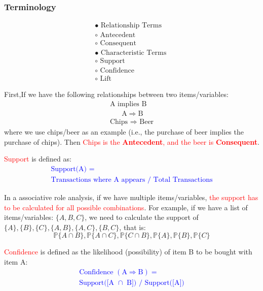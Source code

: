 \documentclass[12pt]{article}
\newcommand{\redp}[1]{\textcolor{red}{#1}}
\newcommand{\bluep}[1]{\textcolor{blue}{#1}}
\begin{document}
\begin{code}
\subsubsection{Terminology}
$$
\begin{array}{c}{\bullet \text { Relationship Terms }} \\ {\circ \text { Antecedent }} \\ {\circ \text { Consequent }} \\ {\bullet \text { Characteristic Terms }} \\ {\circ \text { Support }} \\ {\circ \text { Confidence }} \\ {\circ \text { Lift }}\end{array}
$$

First,If we have the following relationships between two items/variables:
$$
\begin{array}{c}{\text { A implies } \mathrm{B}} \\ {\qquad \mathrm{A} \Rightarrow \mathrm{B}} \\ { \text { Chips } \Rightarrow \text { Beer }} \end{array}
$$
where we use chips/beer as an example (i.e., the purchase of beer implies the purchase of chips). Then \redp{Chips is the \textbf{Antecedent}, and the beer is \textbf{Consequent}}.

\redp{Support }is defined as:\bluep{
$$
\begin{array}{l}{\text { Support(A) }=} \\ {\text { Transactions where A appears / Total Transactions }}\end{array}
$$
}

In a associative role analysis, if we have multiple items/variables, \redp{the support has to be calculated for all possible combinations}. For example, if we have a list of items/variables: $\{A, B, C\}$, we need to calculate the support of $\{A\}, \{B\},\{C\},\{A,B\},\{A,C\},\{B,C\}$, that is:$$
\mathbb{P}\{A\cap B\},\mathbb{P}\{A\cap C\},\mathbb{P}\{C\cap B\},\mathbb{P}\{A\},\mathbb{P}\{ B\},\mathbb{P}\{C\}$$

\redp{Confidence} is defined as the likelihood (possibility) of item B to be bought with item A:\bluep{
$$
\begin{array}{l}{\text { Confidence }(\mathrm{A} \Rightarrow \mathrm{B})=} \\ {\text { Support([A } \cap \text { B]) } / \text { Support([A]) }}\end{array}
$$}


\end{code}
\end{document}

